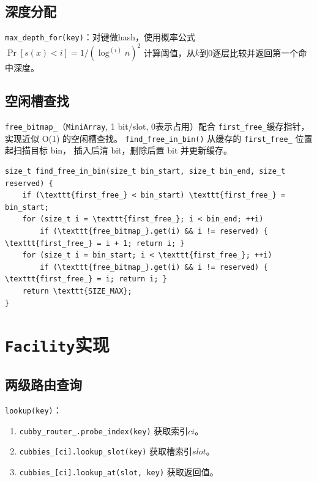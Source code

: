 \documentclass[
    type = bachelor,
    fontset = win,
    decl-page = true,
  ]{njuthesis}
\begin{document}
\subsection{深度分配}

\texttt{max\_depth\_for(key)}：对键做hash，使用概率公式\newline
$\Pr[s(x) < i] = 1/(\log^{(i)} n)^2$ 计算阈值，从$k$到0逐层比较并返回第一个命中深度\cite{1}。

\subsection{空闲槽查找}

\texttt{free\_bitmap\_}（\texttt{MiniArray}, 1 bit/slot, 0表示占用）配合
\texttt{first\_free\_}缓存指针，实现近似 O(1) 的空闲槽查找。
\texttt{find\_free\_in\_bin()} 从缓存的 \texttt{first\_free\_} 位置起扫描目标 bin，
插入后清 bit，删除后置 bit 并更新缓存。

\begin{lstlisting}[caption={find\_free\_in\_bin 空闲槽扫描}]
size_t find_free_in_bin(size_t bin_start, size_t bin_end, size_t reserved) {
    if (\texttt{first_free_} < bin_start) \texttt{first_free_} = bin_start;
    for (size_t i = \texttt{first_free_}; i < bin_end; ++i)
        if (\texttt{free_bitmap_}.get(i) && i != reserved) { \texttt{first_free_} = i + 1; return i; }
    for (size_t i = bin_start; i < \texttt{first_free_}; ++i)
        if (\texttt{free_bitmap_}.get(i) && i != reserved) { \texttt{first_free_} = i; return i; }
    return \texttt{SIZE_MAX};
}
\end{lstlisting}

\section{\texttt{Facility}实现}

\subsection{两级路由查询}

\texttt{lookup(key)}：
\begin{enumerate}
  \item \texttt{cubby\_router\_.probe\_index(key)} 获取索引$ci$。
  \item \texttt{cubbies\_[ci].lookup\_slot(key)} 获取槽索引$slot$。
  \item \texttt{cubbies\_[ci].lookup\_at(slot, key)} 获取返回值。
\end{enumerate}
\end{document}
